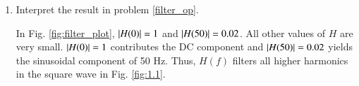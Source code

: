 \documentclass[journal,12pt,twocolumn]{IEEEtran}
\renewcommand\thesection{\arabic{section}}
\begin{document}
\begin{enumerate}[label=\thesection.\arabic*
,ref=\thesection.\theenumi]
\item
Interpret the result in problem \ref{filter_op}.

%
\solution
In Fig. \ref{fig:filter_plot}, $\left\vert H(0)\right\vert = 1$ and $\left\vert H(50)\right\vert = 0.02$.  All other values of $H$ are very small.  $\left\vert H(0)\right\vert = 1$ contributes the DC component and $\left\vert H(50)\right\vert = 0.02$ yields the sinusoidal component of 50 Hz.  Thus, $H(f)$ filters all higher harmonics in the square wave in Fig. \ref{fig:1.1}.
%
%

%
%
%	
%		
%	
%
%			
%
%
%


\end{enumerate}
\end{document}
